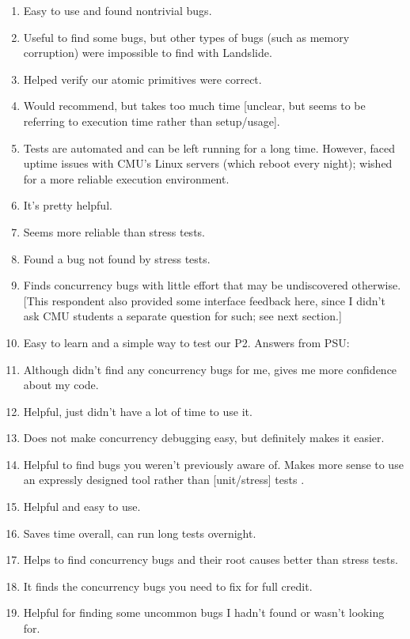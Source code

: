 \begin{enumerate}
	\item Easy to use and found nontrivial bugs.
	\item Useful to find some bugs, but other types of bugs (such as memory corruption) were impossible to find with Landslide.
	\item Helped verify our atomic primitives were correct.
	\item Would recommend, but takes too much time [unclear, but seems to be referring to execution time rather than setup/usage].
	\item Tests are automated and can be left running for a long time.
		However, faced uptime issues with CMU's Linux servers (which reboot every night);
		wished for a more reliable execution environment.
	\item It's pretty helpful. %
	\item Seems more reliable than stress tests.
	\item Found a bug not found by stress tests.
	\item Finds concurrency bugs with little effort that may be undiscovered otherwise.
		[This respondent also provided some interface feedback here, since I didn't ask CMU students a separate question for such;
		see next section.]
	\item Easy to learn and a simple way to test our P2.
Answers from PSU:
	\item Although didn't find any concurrency bugs for me, gives me more confidence about my code.
	\item Helpful, just didn't have a lot of time to use it.
	\item Does not make concurrency debugging easy, but definitely makes it easier.
	\item Helpful to find bugs you weren't previously aware of.
		Makes more sense to use an expressly designed tool rather than [unit/stress] tests
		.
	\item Helpful and easy to use.
	\item Saves time overall, can run long tests overnight.
	\item Helps to find concurrency bugs and their root causes better than stress tests.
	\item It finds the concurrency bugs you need to fix for full credit.
	\item Helpful for finding some uncommon bugs I hadn't found or wasn't looking for.

\end{enumerate}
